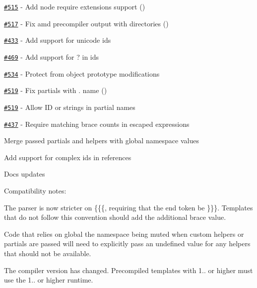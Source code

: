 \begin{DoxyItemize}
\item \href{https://github.com/wycats/handlebars.js/issues/515}{\tt \#515} -\/ Add node require extensions support (\href{https://github.com/jjclark1982}{\tt })
\item \href{https://github.com/wycats/handlebars.js/issues/517}{\tt \#517} -\/ Fix amd precompiler output with directories (\href{https://github.com/blessenm}{\tt })
\item \href{https://github.com/wycats/handlebars.js/issues/433}{\tt \#433} -\/ Add support for unicode ids
\item \href{https://github.com/wycats/handlebars.js/issues/469}{\tt \#469} -\/ Add support for {\ttfamily ?} in ids
\item \href{https://github.com/wycats/handlebars.js/issues/534}{\tt \#534} -\/ Protect from object prototype modifications
\item \href{https://github.com/wycats/handlebars.js/issues/519}{\tt \#519} -\/ Fix partials with . name (\href{https://github.com/jamesgorrie}{\tt })
\item \href{https://github.com/wycats/handlebars.js/issues/519}{\tt \#519} -\/ Allow ID or strings in partial names
\item \href{https://github.com/wycats/handlebars.js/issues/437}{\tt \#437} -\/ Require matching brace counts in escaped expressions
\item Merge passed partials and helpers with global namespace values
\item Add support for complex ids in  references
\item Docs updates
\end{DoxyItemize}

Compatibility notes\+:
\begin{DoxyItemize}
\item The parser is now stricter on {\ttfamily \{\{\{}, requiring that the end token be {\ttfamily \}\}\}}. Templates that do not follow this convention should add the additional brace value.
\item Code that relies on global the namespace being muted when custom helpers or partials are passed will need to explicitly pass an {\ttfamily undefined} value for any helpers that should not be available.
\item The compiler version has changed. Precompiled templates with 1.. or higher must use the 1.. or higher runtime.
\end{DoxyItemize}

